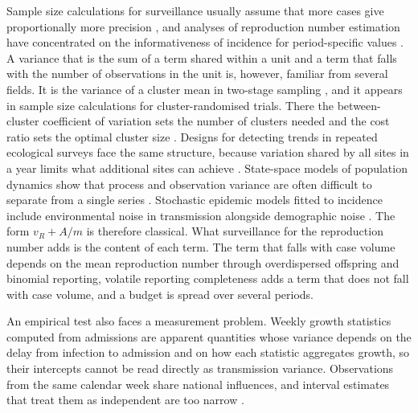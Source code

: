 Sample size calculations for surveillance usually assume that more cases give proportionally more precision \citep{cochran1977sampling}, and analyses of reproduction number estimation have concentrated on the informativeness of incidence for period-specific values \citep{parag2022quantifying, bhatt2023semi}. A variance that is the sum of a term shared within a unit and a term that falls with the number of observations in the unit is, however, familiar from several fields. It is the variance of a cluster mean in two-stage sampling \citep{cochran1977sampling}, and it appears in sample size calculations for cluster-randomised trials. There the between-cluster coefficient of variation sets the number of clusters needed and the cost ratio sets the optimal cluster size \citep{hayes1999simple, raudenbush1997statistical}. Designs for detecting trends in repeated ecological surveys face the same structure, because variation shared by all sites in a year limits what additional sites can achieve \citep{urquhart1999designs, kincaid2004structure}. State-space models of population dynamics show that process and observation variance are often difficult to separate from a single series \citep{knape2008estimability, augermethe2016state}. Stochastic epidemic models fitted to incidence include environmental noise in transmission alongside demographic noise \citep{breto2009time, he2010plug, dureau2013capturing, king2015avoidable}. The form $v_R+A/m$ is therefore classical. What surveillance for the reproduction number adds is the content of each term. The term that falls with case volume depends on the mean reproduction number through overdispersed offspring and binomial reporting, volatile reporting completeness adds a term that does not fall with case volume, and a budget is spread over several periods.

An empirical test also faces a measurement problem. Weekly growth statistics computed from admissions are apparent quantities whose variance depends on the delay from infection to admission and on how each statistic aggregates growth, so their intercepts cannot be read directly as transmission variance. Observations from the same calendar week share national influences, and interval estimates that treat them as independent are too narrow \citep{owen2007pigeonhole, cameron2011robust}.

